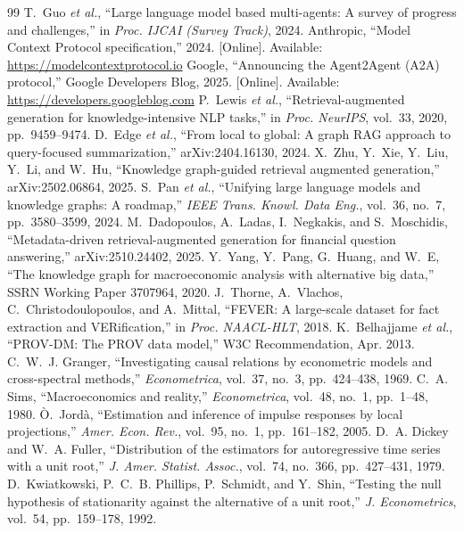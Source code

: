 \documentclass[conference]{IEEEtran}
\begin{document}
\begin{thebibliography}{99}
 T.~Guo \emph{et al.}, ``Large language model based multi-agents: A survey of progress and challenges,'' in \emph{Proc. IJCAI (Survey Track)}, 2024.
 Anthropic, ``Model Context Protocol specification,'' 2024. [Online]. Available: \url{https://modelcontextprotocol.io}
 Google, ``Announcing the Agent2Agent (A2A) protocol,'' Google Developers Blog, 2025. [Online]. Available: \url{https://developers.googleblog.com}
 P.~Lewis \emph{et al.}, ``Retrieval-augmented generation for knowledge-intensive NLP tasks,'' in \emph{Proc. NeurIPS}, vol.~33, 2020, pp.~9459--9474.
 D.~Edge \emph{et al.}, ``From local to global: A graph RAG approach to query-focused summarization,'' arXiv:2404.16130, 2024.
 X.~Zhu, Y.~Xie, Y.~Liu, Y.~Li, and W.~Hu, ``Knowledge graph-guided retrieval augmented generation,'' arXiv:2502.06864, 2025.
 S.~Pan \emph{et al.}, ``Unifying large language models and knowledge graphs: A roadmap,'' \emph{IEEE Trans. Knowl. Data Eng.}, vol.~36, no.~7, pp.~3580--3599, 2024.
 M.~Dadopoulos, A.~Ladas, I.~Negkakis, and S.~Moschidis, ``Metadata-driven retrieval-augmented generation for financial question answering,'' arXiv:2510.24402, 2025.
 Y.~Yang, Y.~Pang, G.~Huang, and W.~E, ``The knowledge graph for macroeconomic analysis with alternative big data,'' SSRN Working Paper 3707964, 2020.
 J.~Thorne, A.~Vlachos, C.~Christodoulopoulos, and A.~Mittal, ``FEVER: A large-scale dataset for fact extraction and VERification,'' in \emph{Proc. NAACL-HLT}, 2018.
 K.~Belhajjame \emph{et al.}, ``PROV-DM: The PROV data model,'' W3C Recommendation, Apr. 2013.
 C.~W.~J. Granger, ``Investigating causal relations by econometric models and cross-spectral methods,'' \emph{Econometrica}, vol.~37, no.~3, pp.~424--438, 1969.
 C.~A. Sims, ``Macroeconomics and reality,'' \emph{Econometrica}, vol.~48, no.~1, pp.~1--48, 1980.
 \`O.~Jord\`a, ``Estimation and inference of impulse responses by local projections,'' \emph{Amer. Econ. Rev.}, vol.~95, no.~1, pp.~161--182, 2005.
 D.~A. Dickey and W.~A. Fuller, ``Distribution of the estimators for autoregressive time series with a unit root,'' \emph{J. Amer. Statist. Assoc.}, vol.~74, no.~366, pp.~427--431, 1979.
 D.~Kwiatkowski, P.~C.~B. Phillips, P.~Schmidt, and Y.~Shin, ``Testing the null hypothesis of stationarity against the alternative of a unit root,'' \emph{J. Econometrics}, vol.~54, pp.~159--178, 1992.

\end{thebibliography}
\end{document}
